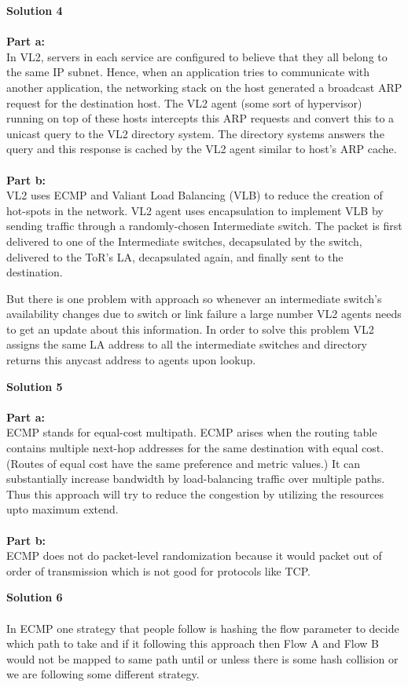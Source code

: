 \documentclass[letterpaper, 11pt]{article}
\begin{document}
\textbf{Solution 4}\\ \\
\textbf{Part a:} \\
In VL2, servers in each service are configured to believe that they all belong to the same IP subnet. Hence, when an application tries to communicate with another application, the networking stack on the host generated a broadcast ARP request for the destination host. The VL2 agent (some sort of hypervisor) running on top of these hosts intercepts this ARP requests and convert this to a unicast query to the VL2 directory system. The directory systems answers the query and this response is cached by the VL2 agent similar to host's ARP cache. \\ \\
\textbf{Part b:} \\
VL2 uses ECMP and Valiant Load Balancing (VLB) to reduce the creation of hot-spots in the network. VL2 agent uses encapsulation to implement VLB by sending traffic through a randomly-chosen Intermediate switch. The packet is first delivered to one of the Intermediate switches, decapsulated by the switch, delivered to the ToR's LA, decapsulated again, and finally sent to the destination.

But there is one problem with approach so whenever an intermediate switch's availability changes due to switch or link failure a large number VL2 agents needs to get an update about this information. In order to solve this problem VL2 assigns the same LA address to all the intermediate switches and directory returns this anycast address to agents upon lookup. 
\bigskip


\textbf{Solution 5}\\ \\
\textbf{Part a:} \\
ECMP stands for equal-cost multipath. ECMP arises when the routing table contains multiple next-hop addresses for the same destination with equal cost. (Routes of equal cost have the same preference and metric values.)
It can substantially increase bandwidth by load-balancing traffic over multiple paths. Thus this approach will try to reduce the congestion by utilizing the resources upto maximum extend. \\ \\
\textbf{Part b:} \\
ECMP does not do packet-level randomization because it would packet out of order of transmission which is not good for protocols like TCP.
\bigskip

\textbf{Solution 6}\\ \\
In ECMP one strategy that people follow is hashing the flow parameter to decide which path to take and if it following this approach then Flow A and Flow B would not be mapped to same path until or unless there is some hash collision or we are following some different strategy.
\bigskip

\clearpage

\end{document}
